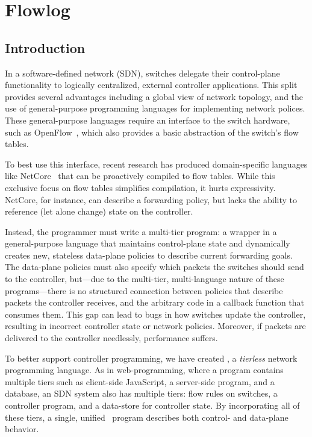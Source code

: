 \chapter{Flowlog}

\section{Introduction}

In a software-defined network (SDN), switches delegate their control-plane
functionality to logically centralized, external controller applications.
This split provides several advantages including a global view of network
topology, and the use of general-purpose programming languages for implementing network polices.
These general-purpose languages require an interface
to the switch hardware, such as OpenFlow~\cite{McKeown:ccr08-openflow},
which also provides a basic abstraction of the switch's flow tables.

To best use this interface, recent research has produced domain-specific languages like
NetCore~\cite{monsanto:popl12-netcore} that can be proactively compiled to
flow tables. While this exclusive focus on flow tables simplifies compilation,
it hurts expressivity.
NetCore, for instance,
can describe a forwarding policy, but lacks the ability to reference (let alone
change) state on the controller.

Instead, the programmer must write a multi-tier program: a wrapper in a
general-purpose language that maintains control-plane state and dynamically creates new,
stateless data-plane policies to describe current forwarding goals. 
The data-plane policies must also specify
which packets the switches should send to the controller, but---due 
to the multi-tier, multi-language nature of these programs---there is no
structured connection between policies that describe packets the controller receives, and the arbitrary
code in a callback function that consumes them. This gap can lead to
bugs in how switches update the controller, resulting in incorrect
controller state or network policies. Moreover, if
packets are delivered to the controller needlessly, performance
suffers.

To better support controller programming, we have created \flowlog, a
\emph{tierless} network programming language. As in web-programming, where 
a program contains multiple tiers such as client-side JavaScript, a
server-side program, and a database, an SDN system also has multiple tiers:
flow rules on switches, a controller program, and a data-store for controller
state. By incorporating all of these tiers, a single, unified \flowlog\ 
program describes both control- and data-plane behavior.

